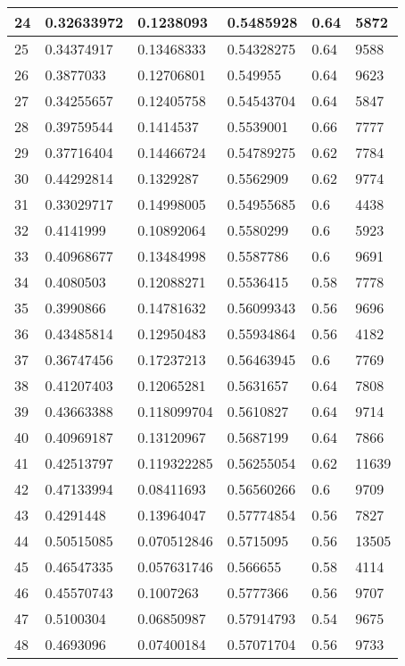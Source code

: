 \begin{longtable}{|l|l|l|l|l|l|}
24 & 0.32633972 & 0.1238093 & 0.5485928 & 0.64 & 5872 \\ \hline 
25 & 0.34374917 & 0.13468333 & 0.54328275 & 0.64 & 9588 \\ \hline 
26 & 0.3877033 & 0.12706801 & 0.549955 & 0.64 & 9623 \\ \hline 
27 & 0.34255657 & 0.12405758 & 0.54543704 & 0.64 & 5847 \\ \hline 
28 & 0.39759544 & 0.1414537 & 0.5539001 & 0.66 & 7777 \\ \hline 
29 & 0.37716404 & 0.14466724 & 0.54789275 & 0.62 & 7784 \\ \hline 
30 & 0.44292814 & 0.1329287 & 0.5562909 & 0.62 & 9774 \\ \hline 
31 & 0.33029717 & 0.14998005 & 0.54955685 & 0.6 & 4438 \\ \hline 
32 & 0.4141999 & 0.10892064 & 0.5580299 & 0.6 & 5923 \\ \hline 
33 & 0.40968677 & 0.13484998 & 0.5587786 & 0.6 & 9691 \\ \hline 
34 & 0.4080503 & 0.12088271 & 0.5536415 & 0.58 & 7778 \\ \hline 
35 & 0.3990866 & 0.14781632 & 0.56099343 & 0.56 & 9696 \\ \hline 
36 & 0.43485814 & 0.12950483 & 0.55934864 & 0.56 & 4182 \\ \hline 
37 & 0.36747456 & 0.17237213 & 0.56463945 & 0.6 & 7769 \\ \hline 
38 & 0.41207403 & 0.12065281 & 0.5631657 & 0.64 & 7808 \\ \hline 
39 & 0.43663388 & 0.118099704 & 0.5610827 & 0.64 & 9714 \\ \hline 
40 & 0.40969187 & 0.13120967 & 0.5687199 & 0.64 & 7866 \\ \hline 
41 & 0.42513797 & 0.119322285 & 0.56255054 & 0.62 & 11639 \\ \hline 
42 & 0.47133994 & 0.08411693 & 0.56560266 & 0.6 & 9709 \\ \hline 
43 & 0.4291448 & 0.13964047 & 0.57774854 & 0.56 & 7827 \\ \hline 
44 & 0.50515085 & 0.070512846 & 0.5715095 & 0.56 & 13505 \\ \hline 
45 & 0.46547335 & 0.057631746 & 0.566655 & 0.58 & 4114 \\ \hline 
46 & 0.45570743 & 0.1007263 & 0.5777366 & 0.56 & 9707 \\ \hline 
47 & 0.5100304 & 0.06850987 & 0.57914793 & 0.54 & 9675 \\ \hline 
48 & 0.4693096 & 0.07400184 & 0.57071704 & 0.56 & 9733 \\ \hline 

\end{longtable}
